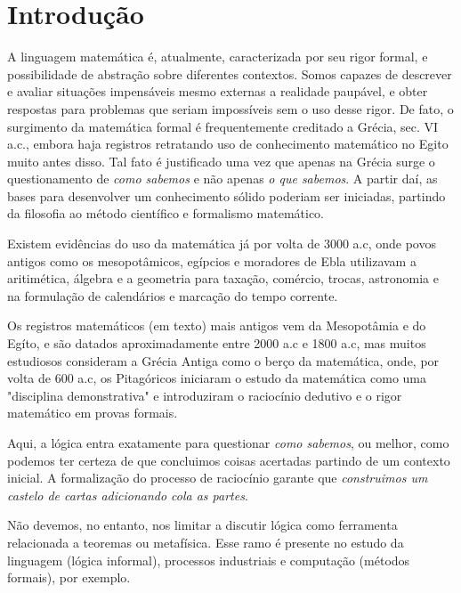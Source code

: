 \chapter{Introdução}
A linguagem matemática é, atualmente, caracterizada por seu rigor formal, e possibilidade de abstração sobre diferentes contextos. Somos capazes de descrever e avaliar situações impensáveis mesmo externas a realidade paupável, e obter respostas para problemas que seriam impossíveis sem o uso desse rigor. De fato, o surgimento da matemática formal é frequentemente creditado a Grécia, sec. VI a.c., embora haja registros retratando uso de conhecimento matemático no Egito muito antes disso. Tal fato é justificado uma vez que apenas na Grécia surge o questionamento de \textit{como sabemos} e não apenas \textit{o que sabemos}. A partir daí, as bases para desenvolver um conhecimento sólido poderiam ser iniciadas, partindo da filosofia ao método científico e formalismo matemático.


Existem evidências do uso da matemática já por volta de 3000 a.c, onde povos antigos como os mesopotâmicos, egípcios e moradores de Ebla utilizavam a aritimética, álgebra e a geometria para taxação, comércio, trocas, astronomia e na formulação de calendários e marcação do tempo corrente. 

Os registros matemáticos (em texto) mais antigos vem da Mesopotâmia e do Egíto, e são datados aproximadamente entre 2000 a.c e 1800 a.c, mas muitos estudiosos consideram a Grécia Antiga como o berço da matemática, onde, por volta de 600 a.c, os Pitagóricos iniciaram o estudo da matemática como uma "disciplina demonstrativa" e introduziram o raciocínio dedutivo e o rigor matemático em provas formais.


Aqui, a lógica entra exatamente para questionar \textit{como sabemos}, ou melhor, como podemos ter certeza de que concluimos coisas acertadas partindo de um contexto inicial. A formalização do processo de raciocínio garante que \textit{construimos um castelo de cartas adicionando cola as partes}.

Não devemos, no entanto, nos limitar a discutir lógica como ferramenta relacionada a teoremas ou metafísica. Esse ramo é presente no estudo da linguagem (lógica informal), processos industriais e computação (métodos formais), por exemplo. %

